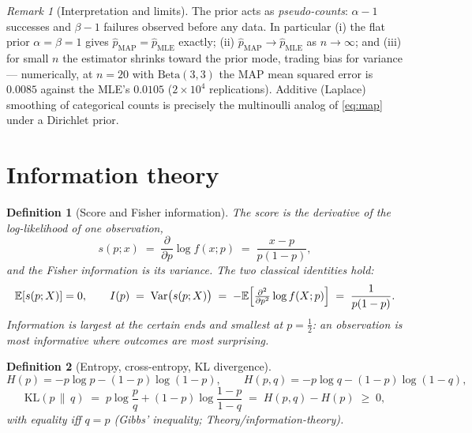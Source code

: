 \documentclass[11pt]{article}
\newtheorem{definition}{Definition}
\theoremstyle{remark}
\newtheorem{remark}{Remark}
\newcommand{\E}{\mathbb{E}}
\newcommand{\Var}{\operatorname{Var}}
\newcommand{\phat}{\hat{p}}
\begin{document}
\begin{remark}[Interpretation and limits]
The prior acts as \emph{pseudo-counts}: $\alpha - 1$ successes and
$\beta - 1$ failures observed before any data. In particular
(i) the flat prior $\alpha = \beta = 1$ gives
$\phat_{\mathrm{MAP}} = \phat_{\mathrm{MLE}}$ exactly;
(ii) $\phat_{\mathrm{MAP}} \to \phat_{\mathrm{MLE}}$ as
$n \to \infty$; and (iii) for small $n$ the estimator shrinks toward
the prior mode, trading bias for variance --- numerically, at
$n = 20$ with $\mathrm{Beta}(3,3)$ the MAP mean squared error is
$0.0085$ against the MLE's $0.0105$ ($2 \times 10^4$ replications).
Additive (Laplace) smoothing of categorical counts is precisely the
multinoulli analog of \eqref{eq:map} under a Dirichlet prior.
\end{remark}

\section{Information theory}

\begin{definition}[Score and Fisher information]
The \emph{score} is the derivative of the log-likelihood of one
observation,
\begin{equation}
  s(p; x) \;=\; \frac{\partial}{\partial p} \log f(x; p)
  \;=\; \frac{x - p}{p(1-p)},
  \label{eq:score}
\end{equation}
and the \emph{Fisher information} is its variance. The two classical
identities hold:
\begin{equation}
  \E[s(p; X)] = 0,
  \qquad
  I(p) \;=\; \Var\bigl(s(p; X)\bigr)
        \;=\; -\E\Bigl[\tfrac{\partial^2}{\partial p^2}
              \log f(X; p)\Bigr]
        \;=\; \frac{1}{p(1-p)}.
  \label{eq:fisher}
\end{equation}
Information is largest at the certain ends and smallest at
$p = \tfrac12$: an observation is most informative where outcomes are
most surprising.
\end{definition}

\begin{definition}[Entropy, cross-entropy, KL divergence]
\begin{equation}
  H(p) = -p\log p - (1-p)\log(1-p),
  \qquad
  H(p, q) = -p\log q - (1-p)\log(1-q),
\end{equation}
\begin{equation}
  \mathrm{KL}(p \,\|\, q)
  \;=\; p \log\frac{p}{q} + (1-p)\log\frac{1-p}{1-q}
  \;=\; H(p, q) - H(p) \;\ge\; 0,
  \label{eq:kl}
\end{equation}
with equality iff $q = p$ (Gibbs' inequality;
Theory/information-theory).
\end{definition}
\end{document}
